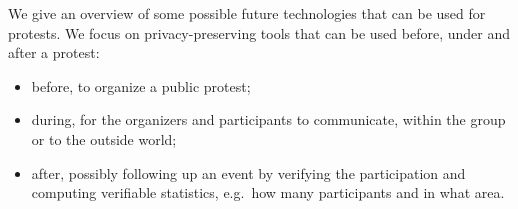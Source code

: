 We give an overview of some possible future technologies that can be used for 
protests.
We focus on privacy-preserving tools that can be used before, under and after 
a protest:
\begin{itemize}
  \item before, to organize a public protest;
  \item during, for the organizers and participants to communicate, within 
    the group or to the outside world;
  \item after, possibly following up an event by verifying the participation 
    and computing verifiable statistics, e.g.\ how many participants and in 
    what area.
\end{itemize}


